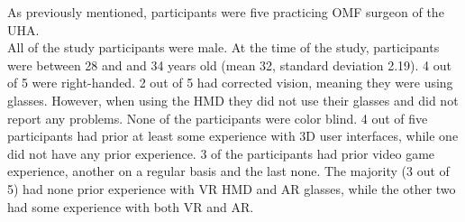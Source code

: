 As previously mentioned, participants were five practicing OMF surgeon of the UHA.
\\ All of the study participants were male.
At the time of the study, participants were between 28 and and 34 years old (mean 32, standard deviation 2.19).
4 out of 5 were right-handed.
2 out of 5 had corrected vision, meaning they were using glasses.
However, when using the HMD they did not use their glasses and did not report any problems.
None of the participants were color blind.
4 out of five participants had prior at least some experience with 3D user interfaces, while one did not have any prior experience.
3 of the participants had prior video game experience, another on a regular basis and the last none.
The majority (3 out of 5) had none prior experience with VR HMD and AR glasses, while the other two had some experience with both VR and AR.